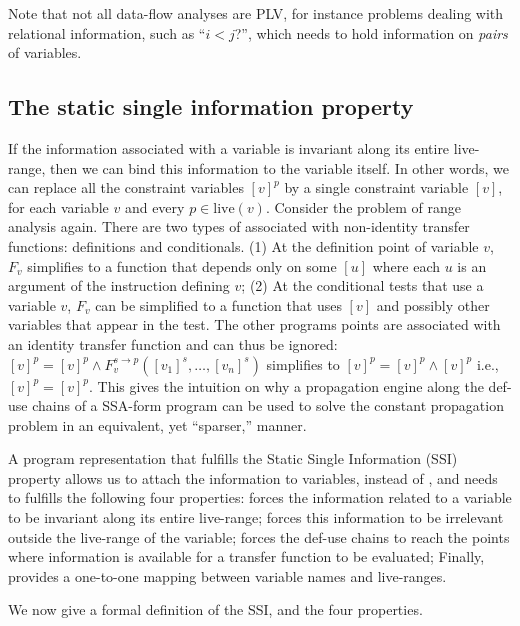 {Note that not all data-flow analyses are PLV, for instance problems dealing 
with relational information, such as ``$i<j$?'', which needs to hold 
information on \emph{pairs} of variables.


\subsection{The static single information property}
\label{sec:ssi:pereira:singProp}

If the information associated with a variable is invariant along its
entire live-range, then we can bind this information to the variable itself.
In other words, we can replace all the constraint variables
$[v]^p$ by a single constraint variable $[v]$, for each variable $v$
and every $p\in \textrm{live}(v)$.  Consider the problem of range analysis 
again. There are two types of \splitpoints associated with non-identity 
transfer functions: definitions and conditionals.
(1) At the definition point of variable $v$, $F_v$ simplifies to a function that depends only on some $[u]$ where each $u$ is an argument of the instruction defining $v$;
(2) At the conditional tests that use a variable $v$, $F_v$ can be simplified to a function that uses $[v]$ and possibly other variables that appear in the test.
The other programs points are associated with an identity transfer function and 
can thus be ignored:  $[v]^p =[v]^p \wedge F_v^{s\to p}([v_1]^s, \dots, 
[v_n]^s)$ simplifies to  $[v]^p = [v]^p \wedge [v]^p$ i.e., $[v]^p = [v]^p$.  
This gives the intuition on why a propagation engine along the def-use chains 
of a SSA-form program can be used to solve the constant propagation problem in 
an equivalent, yet ``sparser,'' manner.


A program representation that fulfills the Static Single Information (SSI) 
property allows us to attach the information to variables, instead of 
\progpoints, and needs to fulfills the following four properties:
\psplit forces the information related to a variable to be invariant along its 
entire live-range;
\pinfo forces this information to be irrelevant outside the live-range of the 
variable;
\plink forces the def-use chains to reach the points where information is 
available for a transfer function to be evaluated;
Finally, \pversion provides a one-to-one mapping between variable names and 
live-ranges.

We now give a formal definition of the SSI, and the four properties.



}
